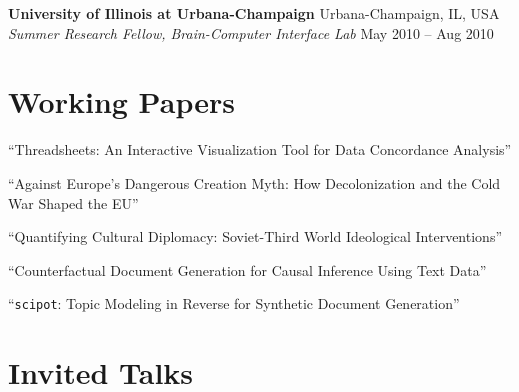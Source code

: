 \documentclass[letterpaper,11pt]{article}
\newcommand{\cvitemsep}{2mm}
\newcommand{\emplitemsep}{3mm}
\begin{document}
	\textbf{University of Illinois at Urbana-Champaign} \hfill{} Urbana-Champaign, IL, USA\\%
	\textsl{\small Summer Research Fellow, Brain-Computer Interface Lab} \hfill{} {\small May 2010 -- Aug 2010}%
    \vspace{\emplitemsep}


\section{Working Papers}

``Threadsheets: An Interactive Visualization Tool for Data Concordance Analysis''

\begin{adjustwidth}{1cm}{}
	\vspace{\cvitemsep}
\end{adjustwidth}
``Against Europe's Dangerous Creation Myth: How Decolonization and the Cold War Shaped the EU''

\begin{adjustwidth}{1cm}{}
	\vspace{\cvitemsep}
\end{adjustwidth}
``Quantifying Cultural Diplomacy: Soviet-Third World Ideological Interventions''

\begin{adjustwidth}{1cm}{}
	\vspace{\cvitemsep}
\end{adjustwidth}
``Counterfactual Document Generation for Causal Inference Using Text Data''

\begin{adjustwidth}{1cm}{}
	\vspace{\cvitemsep}
\end{adjustwidth}
``\texttt{scipot}: Topic Modeling in Reverse for Synthetic Document Generation''

\begin{adjustwidth}{1cm}{}
	}\vspace{\cvitemsep}
\end{adjustwidth}


\section{Invited Talks}
\end{document}
